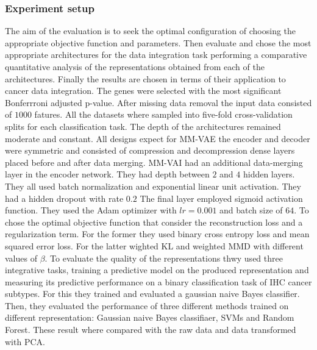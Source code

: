 		\subsubsection{Experiment setup}
		The aim of the evaluation is to seek the optimal configuration of choosing the appropriate objective function and parameters.
		Then evaluate and chose the most appropriate architectures for the data integration task performing a comparative quantitative analysis of the representations obtained from each of the architectures.
		Finally the results are chosen in terms of their application to cancer data integration.
		The genes were selected with the most significant Bonferrroni adjusted p-value.
		After missing data removal the input data consisted of $1000$ fatures.
		All the datasets where sampled into five-fold cross-validation splits for each classification task.
		The depth of the architectures remained moderate and constant.
		All designs expect for MM-VAE the encoder and decoder were symmetric and consisted of compression and decompression dense layers placed before and after data merging.
		MM-VAI had an additional data-merging layer in the encoder network.
		They had depth between $2$ and $4$ hidden layers.
		They all used batch normalization and exponential linear unit activation.
		They had a hidden dropout with rate $0.2$
		The final layer employed sigmoid activation function.
		They used the Adam optimizer with $lr=0.001$ and batch size of $64$.
		To chose the optimal objective function that consider the reconstruction loss and a regularization term.
		For the former they used binary cross entropy loss and mean squared error loss.
		For the latter wighted KL and weighted MMD with different values of $\beta$.
		To evaluate the quality of the representations thwy used three integrative tasks, training a predictive model on the produced representation and measuring its predictive performance on a binary classification task of IHC cancer subtypes.
		For this they trained and evaluated a gaussian naive Bayes classifier.
		Then, they evaluated the performance of three different methods trained on different representation: Gaussian naive Bayes classifiaer, SVMs and Random Forest.
		These result where compared with the raw data and data transformed with PCA.
